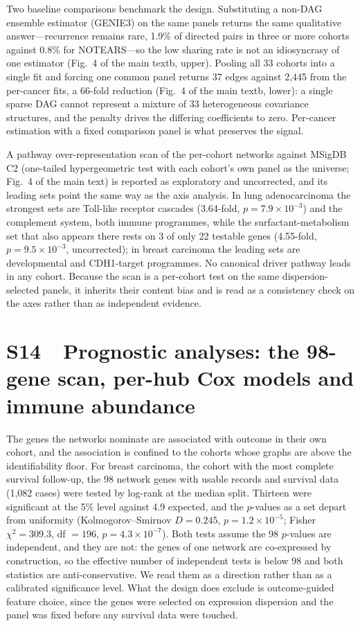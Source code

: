 \documentclass[11pt]{article}
\begin{document}
Two baseline comparisons benchmark the design. Substituting a non-DAG ensemble estimator (GENIE3) on the same panels returns the same qualitative answer---recurrence remains rare, 1.9\% of directed pairs in three or more cohorts against 0.8\% for NOTEARS---so the low sharing rate is not an idiosyncrasy of one estimator (Fig.~4 of the main textb, upper). Pooling all 33 cohorts into a single fit and forcing one common panel returns 37 edges against 2{,}445 from the per-cancer fits, a 66-fold reduction (Fig.~4 of the main textb, lower): a single sparse DAG cannot represent a mixture of 33 heterogeneous covariance structures, and the penalty drives the differing coefficients to zero. Per-cancer estimation with a fixed comparison panel is what preserves the signal.

A pathway over-representation scan of the per-cohort networks against MSigDB C2 (one-tailed hypergeometric test with each cohort's own panel as the universe; Fig.~4 of the main text) is reported as exploratory and uncorrected, and its leading sets point the same way as the axis analysis. In lung adenocarcinoma the strongest sets are Toll-like receptor cascades (3.64-fold, $p = 7.9 \times 10^{-3}$) and the complement system, both immune programmes, while the surfactant-metabolism set that also appears there rests on 3 of only 22 testable genes (4.55-fold, $p = 9.5 \times 10^{-3}$, uncorrected); in breast carcinoma the leading sets are developmental and CDH1-target programmes. No canonical driver pathway leads in any cohort. Because the scan is a per-cohort test on the same dispersion-selected panels, it inherits their content bias and is read as a consistency check on the axes rather than as independent evidence.

\section*{S14\ \ Prognostic analyses: the 98-gene scan, per-hub Cox models and immune abundance}

The genes the networks nominate are associated with outcome in their own cohort, and the association is confined to the cohorts whose graphs are above the identifiability floor. For breast carcinoma, the cohort with the most complete survival follow-up, the 98 network genes with usable records and survival data (1{,}082 cases) were tested by log-rank at the median split. Thirteen were significant at the 5\% level against 4.9 expected, and the $p$-values as a
set depart from uniformity (Kolmogorov--Smirnov $D = 0.245$, $p = 1.2 \times 10^{-5}$; Fisher
$\chi^2 = 309.3$, df $= 196$, $p = 4.3 \times 10^{-7}$). Both tests assume the 98 $p$-values are
independent, and they are not: the genes of one network are co-expressed by construction, so the
effective number of independent tests is below 98 and both statistics are anti-conservative. We
read them as a direction rather than as a calibrated significance level. What the design does
exclude is outcome-guided feature choice, since the genes were selected on expression dispersion
and the panel was fixed before any survival data were touched.
\end{document}
